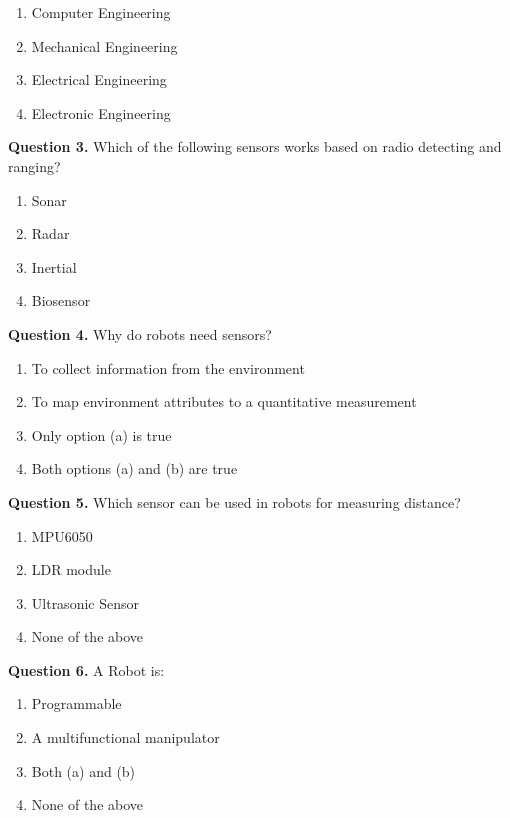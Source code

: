 \documentclass[11pt,a4paper]{article}
\begin{document}
\begin{enumerate}[label=(\alph*),itemsep=2pt]
  \item Computer Engineering
  \item Mechanical Engineering
  \item Electrical Engineering
  \item Electronic Engineering
\end{enumerate}

\medskip


\noindent   \textbf{Question 3.} Which of the following sensors works based on radio detecting and ranging?

\begin{enumerate}[label=(\alph*),itemsep=2pt]
  \item Sonar
  \item Radar
  \item Inertial
  \item Biosensor
\end{enumerate}

\medskip


\noindent   \textbf{Question 4.} Why do robots need sensors?

\begin{enumerate}[label=(\alph*),itemsep=2pt]
  \item To collect information from the environment
  \item To map environment attributes to a quantitative measurement
  \item Only option (a) is true
  \item Both options (a) and (b) are true
\end{enumerate}

\medskip


\noindent   \textbf{Question 5.} Which sensor can be used in robots for measuring distance?

\begin{enumerate}[label=(\alph*),itemsep=2pt]
  \item MPU6050
  \item LDR module
  \item Ultrasonic Sensor
  \item None of the above
\end{enumerate}

\medskip


\noindent   \textbf{Question 6.} A Robot is:

\begin{enumerate}[label=(\alph*),itemsep=2pt]
  \item Programmable
  \item A multifunctional manipulator
  \item Both (a) and (b)
  \item None of the above
\end{enumerate}
\end{document}
